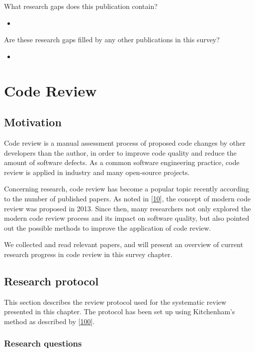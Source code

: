 \documentclass[]{book}
\begin{document}
What research gaps does this publication contain?

\begin{itemize}
\item
\end{itemize}

Are these research gaps filled by any other publications in this survey?

\begin{itemize}
\item
\end{itemize}

\chapter{Code Review}\label{code-review}

\section{Motivation}\label{motivation-5}

Code review is a manual assessment process of proposed code changes by
other developers than the author, in order to improve code quality and
reduce the amount of software defects. As a common software engineering
practice, code review is applied in industry and many open-source
projects.

Concerning research, code review has become a popular topic recently
according to the number of published papers. As noted in
{[}\protect\hyperlink{ref-bacchelli2013expectations}{10}{]}, the concept
of modern code review was proposed in 2013. Since then, many researchers
not only explored the modern code review process and its impact on
software quality, but also pointed out the possible methods to improve
the application of code review.

We collected and read relevant papers, and will present an overview of
current research progress in code review in this survey chapter.

\section{Research protocol}\label{research-protocol-5}

This section describes the review protocol used for the systematic
review presented in this chapter. The protocol has been set up using
Kitchenham's method as described by
{[}\protect\hyperlink{ref-kitchenham2007}{100}{]}.

\subsection{Research questions}\label{research-questions-2}
\end{document}
